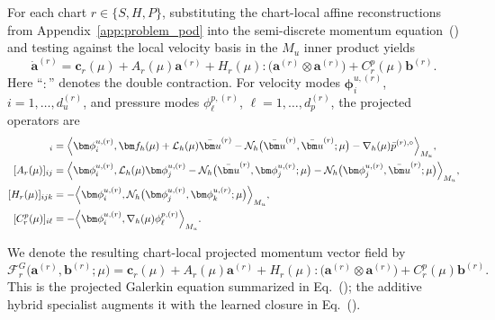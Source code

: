 For each chart $r\in\{S,H,P\}$, substituting the chart-local affine reconstructions from Appendix~\ref{app:problem_pod} into the semi-discrete momentum equation~() and testing against the local
velocity basis in the $M_u$ inner product yields
\begin{equation}
    \dot{\bm a}^{(r)}
    =
    \bm c_r(\mu)
    +
    A_r(\mu)\bm a^{(r)}
    +
    H_r(\mu):
    \bigl(
        \bm a^{(r)}\otimes\bm a^{(r)}
    \bigr)
    +
    C_r^p(\mu)\bm b^{(r)}.
    \label{eq:app_projected_momentum}
\end{equation}
Here ``$:$'' denotes the double contraction.
For velocity modes
$\bm\phi_i^{u,(r)}$,
$i=1,\ldots,d_u^{(r)}$,
and pressure modes
$\phi_\ell^{p,(r)}$,
$\ell=1,\ldots,d_p^{(r)}$,
the projected operators are
\begin{align}
    [\bm c_r(\mu)]_i
    &=
    \Bigl\langle
        \bm\phi_i^{u,(r)},
        \bm f_h(\mu)
        +
        \mathcal L_h(\mu)\bar{\bm u}^{(r)}
        -
        \mathcal N_h
        \bigl(
            \bar{\bm u}^{(r)},
            \bar{\bm u}^{(r)};
            \mu
        \bigr)
        -
        \nabla_h(\mu)\bar p^{(r),\circ}
    \Bigr\rangle_{M_u},
    \\
    [A_r(\mu)]_{ij}
    &=
    \Bigl\langle
        \bm\phi_i^{u,(r)},
        \mathcal L_h(\mu)\bm\phi_j^{u,(r)}
        -
        \mathcal N_h
        \bigl(
            \bar{\bm u}^{(r)},
            \bm\phi_j^{u,(r)};
            \mu
        \bigr)
        -
        \mathcal N_h
        \bigl(
            \bm\phi_j^{u,(r)},
            \bar{\bm u}^{(r)};
            \mu
        \bigr)
    \Bigr\rangle_{M_u},
    \\
    [H_r(\mu)]_{ijk}
    &=
    -
    \Bigl\langle
        \bm\phi_i^{u,(r)},
        \mathcal N_h
        \bigl(
            \bm\phi_j^{u,(r)},
            \bm\phi_k^{u,(r)};
            \mu
        \bigr)
    \Bigr\rangle_{M_u},
    \\
    [C_r^p(\mu)]_{i\ell}
    &=
    -
    \Bigl\langle
        \bm\phi_i^{u,(r)},
        \nabla_h(\mu)\phi_\ell^{p,(r)}
    \Bigr\rangle_{M_u}.
    \label{eq:app_projected_operators}
\end{align}

We denote the resulting chart-local projected momentum vector field by
\begin{equation}
    \mathcal F_r^G
    \bigl(
        \bm a^{(r)},
        \bm b^{(r)};
        \mu
    \bigr)
    =
    \bm c_r(\mu)
    +
    A_r(\mu)\bm a^{(r)}
    +
    H_r(\mu):
    \bigl(
        \bm a^{(r)}\otimes\bm a^{(r)}
    \bigr)
    +
    C_r^p(\mu)\bm b^{(r)}.
    \label{eq:app_galerkin_backbone}
\end{equation}
This is the projected Galerkin equation summarized in
Eq.~(); the additive hybrid specialist augments it with the learned closure in Eq.~().


